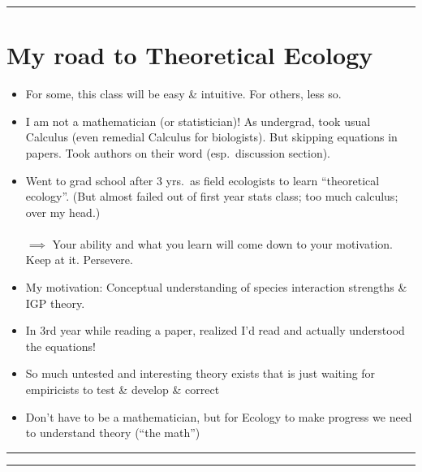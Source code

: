 \documentclass{article}
\begin{document}
\rule[0.5ex]{\linewidth}{1pt}

\section*{My road to Theoretical Ecology}
\begin{itemize}
	\item For some, this class will be easy \& intuitive.  For others, less so.
	\item I am not a mathematician (or statistician)!  As undergrad, took usual Calculus (even remedial Calculus for biologists).  But skipping equations in papers.  Took authors on their word (esp.~discussion section).
	\item Went to grad school after 3 yrs.~as field ecologists to learn ``theoretical ecology''. (But almost failed out of first year stats class; too much calculus; over my head.)\\\\
	$\implies$ Your ability and what you learn will come down to your motivation.  Keep at it.  Persevere.
	\item My motivation: Conceptual understanding of species interaction strengths \& IGP theory.
	\item In 3rd year while reading a paper, realized I'd read and actually understood the equations!\\
	\item So much untested and interesting theory exists that is just waiting for empiricists to test \& develop \& correct
	\item Don't have to be a mathematician, but for Ecology to make progress we need to understand theory (``the math'') 
\end{itemize}

\rule[0.5ex]{\linewidth}{1pt}
\rule[0.5ex]{\linewidth}{1pt}
\end{document}
